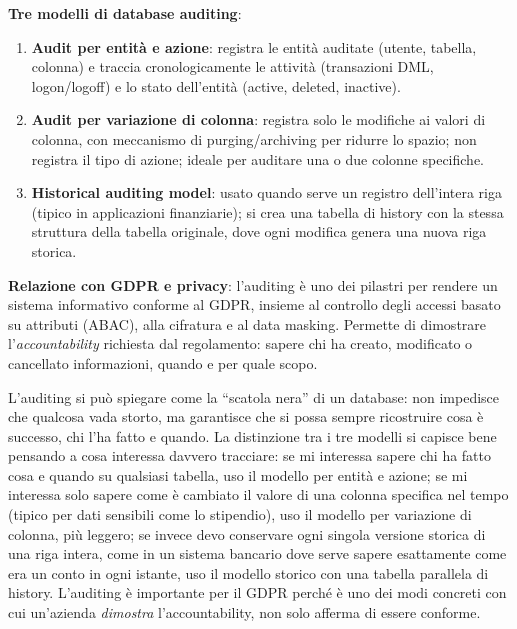 \documentclass[a4paper,11pt]{article}
\begin{document}
\textbf{Tre modelli di database auditing}:
\begin{enumerate}
  \item \textbf{Audit per entit\`{a} e azione}: registra le entit\`{a} auditate (utente, tabella, colonna) e traccia cronologicamente le attivit\`{a} (transazioni DML, logon/logoff) e lo stato dell'entit\`{a} (active, deleted, inactive).
  \item \textbf{Audit per variazione di colonna}: registra solo le modifiche ai valori di colonna, con meccanismo di purging/archiving per ridurre lo spazio; non registra il tipo di azione; ideale per auditare una o due colonne specifiche.
  \item \textbf{Historical auditing model}: usato quando serve un registro dell'intera riga (tipico in applicazioni finanziarie); si crea una tabella di history con la stessa struttura della tabella originale, dove ogni modifica genera una nuova riga storica.
\end{enumerate}

\textbf{Relazione con GDPR e privacy}: l'auditing \`{e} uno dei pilastri per rendere un sistema informativo conforme al GDPR, insieme al controllo degli accessi basato su attributi (ABAC), alla cifratura e al data masking. Permette di dimostrare l'\emph{accountability} richiesta dal regolamento: sapere chi ha creato, modificato o cancellato informazioni, quando e per quale scopo.

\begin{nota}
L'auditing si pu\`{o} spiegare come la ``scatola nera'' di un database: non impedisce che qualcosa vada storto, ma garantisce che si possa sempre ricostruire cosa \`{e} successo, chi l'ha fatto e quando. La distinzione tra i tre modelli si capisce bene pensando a cosa interessa davvero tracciare: se mi interessa sapere chi ha fatto cosa e quando su qualsiasi tabella, uso il modello per entit\`{a} e azione; se mi interessa solo sapere come \`{e} cambiato il valore di una colonna specifica nel tempo (tipico per dati sensibili come lo stipendio), uso il modello per variazione di colonna, pi\`{u} leggero; se invece devo conservare ogni singola versione storica di una riga intera, come in un sistema bancario dove serve sapere esattamente come era un conto in ogni istante, uso il modello storico con una tabella parallela di history. L'auditing \`{e} importante per il GDPR perch\'{e} \`{e} uno dei modi concreti con cui un'azienda \emph{dimostra} l'accountability, non solo afferma di essere conforme.
\end{nota}
\end{document}
